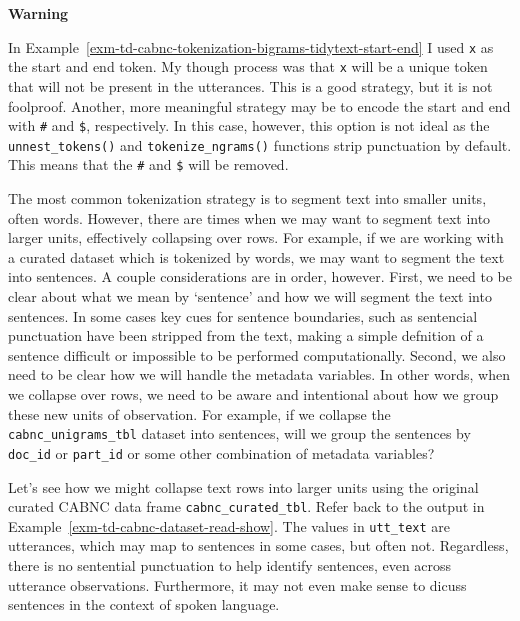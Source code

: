 \documentclass[
  letterpaper,
  DIV=11,
  numbers=noendperiod]{scrreport}
\theoremstyle{definition}
\theoremstyle{remark}
\begin{document}
\begin{tcolorbox}[enhanced jigsaw, breakable, colback=white, rightrule=.15mm, arc=.35mm, left=2mm, toprule=.15mm, leftrule=.75mm, bottomrule=.15mm, opacityback=0]

\textbf{ Warning}

In Example~\ref{exm-td-cabnc-tokenization-bigrams-tidytext-start-end} I
used \texttt{x} as the start and end token. My though process was that
\texttt{x} will be a unique token that will not be present in the
utterances. This is a good strategy, but it is not foolproof. Another,
more meaningful strategy may be to encode the start and end with
\texttt{\#} and \texttt{\$}, respectively. In this case, however, this
option is not ideal as the \texttt{unnest\_tokens()} and
\texttt{tokenize\_ngrams()} functions strip punctuation by default. This
means that the \texttt{\#} and \texttt{\$} will be removed.

\end{tcolorbox}

The most common tokenization strategy is to segment text into smaller
units, often words. However, there are times when we may want to segment
text into larger units, effectively collapsing over rows. For example,
if we are working with a curated dataset which is tokenized by words, we
may want to segment the text into sentences. A couple considerations are
in order, however. First, we need to be clear about what we mean by
`sentence' and how we will segment the text into sentences. In some
cases key cues for sentence boundaries, such as sentencial punctuation
have been stripped from the text, making a simple defnition of a
sentence difficult or impossible to be performed computationally.
Second, we also need to be clear how we will handle the metadata
variables. In other words, when we collapse over rows, we need to be
aware and intentional about how we group these new units of observation.
For example, if we collapse the \texttt{cabnc\_unigrams\_tbl} dataset
into sentences, will we group the sentences by \texttt{doc\_id} or
\texttt{part\_id} or some other combination of metadata variables?

Let's see how we might collapse text rows into larger units using the
original curated CABNC data frame \texttt{cabnc\_curated\_tbl}. Refer
back to the output in Example~\ref{exm-td-cabnc-dataset-read-show}. The
values in \texttt{utt\_text} are utterances, which may map to sentences
in some cases, but often not. Regardless, there is no sentential
punctuation to help identify sentences, even across utterance
observations. Furthermore, it may not even make sense to dicuss
sentences in the context of spoken language.
\end{document}
